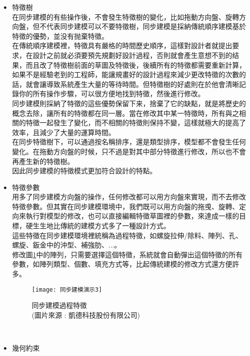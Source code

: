 \begin{itemize}
\item 特徵樹\\

在同步建模的有些操作後，不會發生特徵樹的變化，比如拖動方向盤、旋轉方向盤，但不代表同步建模可以不要特徵樹，同步建模是採納傳統順序建模基於特徵的優勢，並没有抛棄特徵。\\

在傳統順序建模裡，特徵具有嚴格的時間歷史順序，這樣對設計者就提出要求，在設計之前就必須要預先規劃好設計過程，否則就會產生意想不到的结果，而且改了特徵樹前面的草圖及特徵後，後續所有的特徵都需要重新計算，如果不是經驗老到的工程師，能讓規畫好的設計過程來減少更改特徵的次數的話，就會讓導致系統產生大量的等待時間。但特徵樹的好處則在於他會清晰記錄你的所有操作步驟，可以很方便地找到特徵，然後進行修改。\\

同步建模則採納了特徵的這些優勢保留下来，捨棄了它的缺點，就是將歷史的概念去除，讓所有的特徵都在同一層。當在修改其中某一特徵時，所有與之相關的特徵一起發生了變化，而不相關的特徵則保持不變，這樣就極大的提高了效率，且減少了大量的運算時間。 \\

在同步特徵樹下，可以通過按名稱排序，還是類型排序，模型都不會發生任何變化。在拖動方向盤的时候，只不過是對其中部分特徵進行修改，所以也不會再產生新的特徵樹。\\

因此同步建模的特徵模式更加符合設計的特點。\\

\item 特徵參數\\

用多了同步建模方向盤的操作，任何修改都可以用方向盤來實現，而不去修改特徵參數。但其實在同步建模環境中，我們既可以用方向盤的拖曵、旋轉、定向來執行對模型的修改，也可以直接編輯特徵草圖裡的參數，來達成一樣的目標，硬生生地比傳統的建模方式多了一種設計方式。\\

這些特徵在同步建模環境裡統稱為過程特徵，如螺旋拉伸/除料、陣列、孔、螺旋、鈑金中的沖型、補強肋、...。\\

修改圖\ref{2.81}中的陣列，只需要選擇這個特徵，系統就會自動彈出這個特徵的所有參數，如陣列類型、個數、填充方式等，比起傳統建模的修改方式還方便許多。\\
\begin{figure}[hbt!]
\begin{center}
\texttt{[image: 同步建模演示3]}
\caption{\Large 同步建模過程特徵\\(圖片來源 : 凱德科技股份有限公司)}\label{2.81}
\end{center}
\end{figure}
\\
\item 幾何約束\\


\end{itemize}
